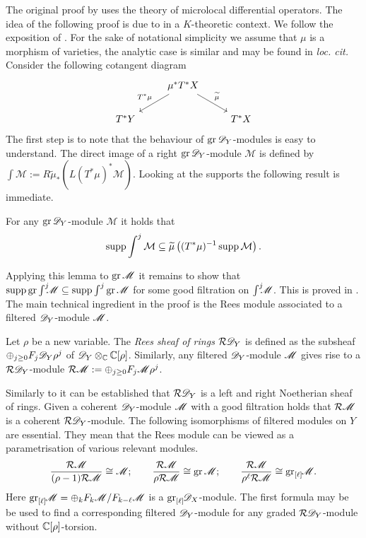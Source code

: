 The original proof by \cite{kashiwara1976b} uses the theory of microlocal differential operators.
The idea of the following proof is due to \cite{malgrange1985images} in a $K$-theoretic context.
We follow the exposition of \cite{sabbah2011introduction}.
For the sake of notational simplicity we assume that $\mu$ is a morphism of varieties, the analytic case is similar and may be found in {\it loc. cit.}
\\

Consider the following cotangent diagram
$$
\begin{tikzcd}
    & \mu^* T^* X \arrow[swap]{ld}{T^* \mu} \arrow{rd}{\widetilde{\mu}} & \\
    T^* Y & & T^*X
\end{tikzcd}
$$
The first step is to note that the behaviour of $\operatorname{gr} \mathscr{D}_Y$-modules is easy to understand.
The direct image of a right $\operatorname{gr} \mathscr{D}_Y$-module $\mathcal{M}$ is defined by $\int \mathcal{M} :=  R\widetilde{\mu}_* ( L(T^*\mu)^*\mathcal{M}).$
Looking at the supports the following result is immediate.
\begin{lemma}\label{lem: GrKashiwara}
    For any $\operatorname{gr}\mathscr{D}_Y$-module $\mathcal{M}$ it holds that
    $$\operatorname{supp} \int^j \mathcal{M}\subseteq \widetilde{\mu}\left((T^* \mu)^{-1} \operatorname{supp} \mathcal{M}\right).$$
\end{lemma}
Applying this lemma to $\operatorname{gr}\mathscr{M}$ it remains to show that $\operatorname{supp}\operatorname{gr}\int^j \mkern -8mu\mathscr{M}\subseteq \operatorname{supp}\int^j \operatorname{gr}\mathscr{M}$ for some good filtration on $\int^j \mkern -8mu\mathscr{M}$.
This is proved in .
The main technical ingredient in the proof is the Rees module associated to a filtered $\mathscr{D}_Y$-module $\mathscr{M}$.
\begin{definition}
    Let $\rho$ be a new variable. The {\it Rees sheaf of rings} $\mathcal{R}\mathscr{D}_Y$ is defined as the subsheaf $\oplus_{j\geq 0} F_j \mathscr{D}_Y \rho^j $ of $\mathscr{D}_Y \otimes_{\mathbb{C}} \mathbb{C}[\rho]$.
    Similarly, any filtered $\mathscr{D}_Y$-module $\mathscr{M}$ gives rise to a $\mathcal{R}\mathscr{D}_Y$-module $\mathcal{R}\mathscr{M} := \oplus_{j\geq 0} F_j \mathscr{M} \rho^j$.
\end{definition}
Similarly to  it can be established that $\mathcal{R} \mathscr{D}_Y$ is a left and right Noetherian sheaf of rings. 
Given a coherent $\mathscr{D}_Y$-module $\mathscr{M}$ with a good filtration holds that $\mathcal{R}\mathscr{M}$ is a coherent $\mathcal{R}\mathscr{D}_Y$-module.%
The following isomorphisms of filtered modules on $Y$ are essential.
They mean that the Rees module can be viewed as a parametrisation of various relevant modules.
$$\frac{\mathcal{R}\mathscr{M}}{(\rho-1)\mathcal{R}\mathscr{M}} \cong \mathscr{M}; \qquad \frac{\mathcal{R}\mathscr{M}}{\rho\mathcal{R}\mathscr{M}} \cong \operatorname{gr} \mathscr{M};\qquad \frac{\mathcal{R}\mathscr{M}}{\rho^\ell\mathcal{R}\mathscr{M}} \cong  \operatorname{gr}_{[\ell]}\mkern-5mu\mathscr{M}.$$
Here $\operatorname{gr}_{[\ell]}\mkern-5mu\mathscr{M} = \oplus_k F_{k}\mathscr{M}/F_{k-\ell}\mathscr{M}$ is a $\operatorname{gr}_{[\ell]}\mkern-5mu \mathscr{D}_X$-module.
The first formula may be be used to find a corresponding filtered $\mathscr{D}_Y$-module for any graded $\mathcal{R}\mathscr{D}_Y$-module without $\mathbb{C}[\rho]$-torsion.

